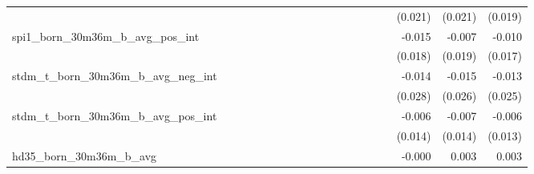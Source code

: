 \begin{tabular}{lrrrrrrrrrrrrrrrrrr}
                                            &              &              &              &              &              &              &              &              &               &              &              &               &              &              &               &      (0.021) &      (0.021) &       (0.019) \\ 
spi1\_born\_30m36m\_b\_avg\_pos\_int        &              &              &              &              &              &              &              &              &               &              &              &               &              &              &               &       -0.015 &       -0.007 &        -0.010 \\ 
                                            &              &              &              &              &              &              &              &              &               &              &              &               &              &              &               &      (0.018) &      (0.019) &       (0.017) \\ 
stdm\_t\_born\_30m36m\_b\_avg\_neg\_int     &              &              &              &              &              &              &              &              &               &              &              &               &              &              &               &       -0.014 &       -0.015 &        -0.013 \\ 
                                            &              &              &              &              &              &              &              &              &               &              &              &               &              &              &               &      (0.028) &      (0.026) &       (0.025) \\ 
stdm\_t\_born\_30m36m\_b\_avg\_pos\_int     &              &              &              &              &              &              &              &              &               &              &              &               &              &              &               &       -0.006 &       -0.007 &        -0.006 \\ 
                                            &              &              &              &              &              &              &              &              &               &              &              &               &              &              &               &      (0.014) &      (0.014) &       (0.013) \\ 
hd35\_born\_30m36m\_b\_avg                  &              &              &              &              &              &              &              &              &               &              &              &               &              &              &               &       -0.000 &        0.003 &         0.003 \\ 

\end{tabular}
